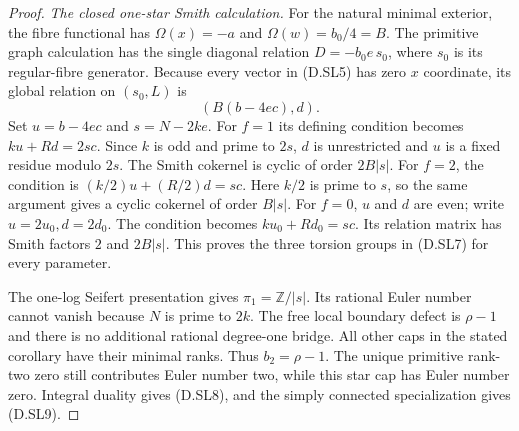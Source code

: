 \begin{proof}
\emph{The closed one-star Smith calculation.}
For the natural minimal exterior, the
fibre functional has
$\Omega(x)=-a$ and $\Omega(w)=b_0/4=B$.
The primitive graph calculation has the
single diagonal relation $D=-b_0e\,s_0$,
where $s_0$ is its regular-fibre generator.
Because every vector in (D.SL5) has zero
$x$ coordinate, its global relation on
$(s_0,L)$ is
\[
                         (B(b-4ec),d).                   \tag{D.SL23}
\]
Set $u=b-4ec$ and $s=N-2ke$.
For $f=1$ its defining condition becomes
$ku+Rd=2sc$. Since $k$ is odd and prime
to $2s$, $d$ is unrestricted and
$u$ is a fixed residue modulo $2s$.
The Smith cokernel is cyclic of order
$2B|s|$.
For $f=2$, the condition is
$(k/2)u+(R/2)d=sc$.
Here $k/2$ is prime to $s$, so the same
argument gives a cyclic cokernel of
order $B|s|$.
For $f=0$, $u$ and $d$ are even; write
$u=2u_0,d=2d_0$. The condition becomes
$ku_0+Rd_0=sc$. Its relation matrix has
Smith factors $2$ and $2B|s|$.
This proves the three torsion groups
in (D.SL7) for every parameter.

The one-log Seifert presentation gives
$\pi_1=\mathbb Z/|s|$. Its rational
Euler number cannot vanish because
$N$ is prime to $2k$. The free local
boundary defect is $\rho-1$ and there
is no additional rational degree-one
bridge. All other caps in the stated
corollary have their minimal ranks.
Thus $b_2=\rho-1$. The unique primitive
rank-two zero still contributes Euler
number two, while this star cap has
Euler number zero. Integral duality
gives (D.SL8), and the simply connected
specialization gives (D.SL9).
\end{proof}
